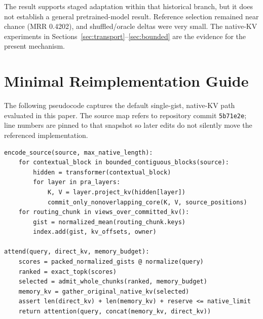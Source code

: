 \documentclass[11pt]{article}
\begin{document}
The result supports staged adaptation within that historical branch, but it does not establish a
general pretrained-model result. Reference selection remained near chance (MRR 0.4202), and
shuffled/oracle deltas were very small. The native-KV experiments in
Sections~\ref{sec:transport}--\ref{sec:bounded} are the evidence for the present mechanism.

\section{Minimal Reimplementation Guide}
\label{app:implementation}

The following pseudocode captures the default single-gist, native-KV path evaluated in
this paper. The source map refers to repository commit \texttt{5b71e2e}; line numbers are
pinned to that snapshot so later edits do not silently move the referenced implementation.

\begin{verbatim}
encode_source(source, max_native_length):
    for contextual_block in bounded_contiguous_blocks(source):
        hidden = transformer(contextual_block)
        for layer in pra_layers:
            K, V = layer.project_kv(hidden[layer])
            commit_only_nonoverlapping_core(K, V, source_positions)
    for routing_chunk in views_over_committed_kv():
        gist = normalized_mean(routing_chunk.keys)
        index.add(gist, kv_offsets, owner)

attend(query, direct_kv, memory_budget):
    scores = packed_normalized_gists @ normalize(query)
    ranked = exact_topk(scores)
    selected = admit_whole_chunks(ranked, memory_budget)
    memory_kv = gather_original_native_kv(selected)
    assert len(direct_kv) + len(memory_kv) + reserve <= native_limit
    return attention(query, concat(memory_kv, direct_kv))
\end{verbatim}
\end{document}
